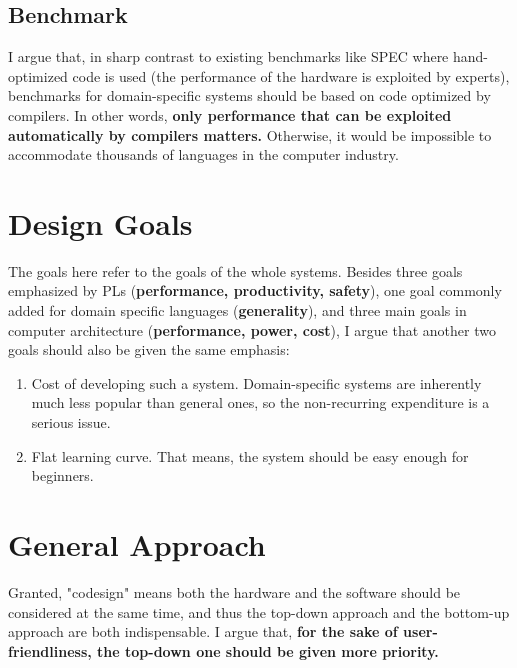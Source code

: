 \documentclass[11pt]{article}
\begin{document}
\subsection{Benchmark}
I argue that, in sharp contrast to existing benchmarks like SPEC where hand-optimized code is used (the performance of the hardware is exploited by experts), benchmarks for domain-specific systems should be based on code optimized by compilers.
In other words, \textbf{only performance that can be exploited automatically by compilers matters.}
Otherwise, it would be impossible to accommodate thousands of languages in the computer industry.


\section{Design Goals}
The goals here refer to the goals of the whole systems. Besides three goals emphasized by PLs (\textbf{performance, productivity, safety}), one goal commonly added for domain specific languages (\textbf{generality}), and three main goals in computer architecture (\textbf{performance, power, cost}), I argue that another two goals should also be given the same emphasis:
\begin{enumerate}
    \item Cost of developing such a system.
    Domain-specific systems are inherently much less popular than general ones, so the non-recurring expenditure is a serious issue.
    \item Flat learning curve.
    That means, the system should be easy enough for beginners.
\end{enumerate}

\section{General Approach}
Granted, "codesign" means both the hardware and the software should be considered at the same time, and thus the top-down approach and the bottom-up approach are both indispensable.
I argue that, \textbf{for the sake of user-friendliness, the top-down one should be given more priority.}
\end{document}
